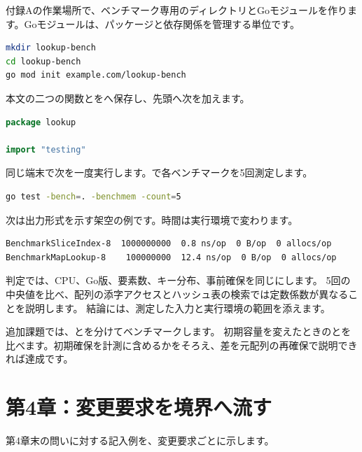 付録Aの作業場所で、ベンチマーク専用のディレクトリとGoモジュールを作ります。Goモジュールは、パッケージと依存関係を管理する単位です。

\begin{lstlisting}[language=bash]
mkdir lookup-bench
cd lookup-bench
go mod init example.com/lookup-bench
\end{lstlisting}

本文の二つの関数とをへ保存し、先頭へ次を加えます。

\begin{lstlisting}[language=Go]
package lookup

import "testing"
\end{lstlisting}

同じ端末で次を一度実行します。で各ベンチマークを5回測定します。

\begin{lstlisting}[language=bash]
go test -bench=. -benchmem -count=5
\end{lstlisting}

次は出力形式を示す架空の例です。時間は実行環境で変わります。

\begin{lstlisting}[language=bash]
BenchmarkSliceIndex-8  1000000000  0.8 ns/op  0 B/op  0 allocs/op
BenchmarkMapLookup-8    100000000  12.4 ns/op  0 B/op  0 allocs/op
\end{lstlisting}

判定では、CPU、Go版、要素数、キー分布、事前確保を同じにします。
5回の中央値を比べ、配列の添字アクセスとハッシュ表の検索では定数係数が異なることを説明します。
結論には、測定した入力と実行環境の範囲を添えます。

追加課題では、とを分けてベンチマークします。
初期容量を変えたときのとを比べます。初期確保を計測に含めるかをそろえ、差を元配列の再確保で説明できれば達成です。

\section{第4章：変更要求を境界へ流す}

第4章末の問いに対する記入例を、変更要求ごとに示します。

